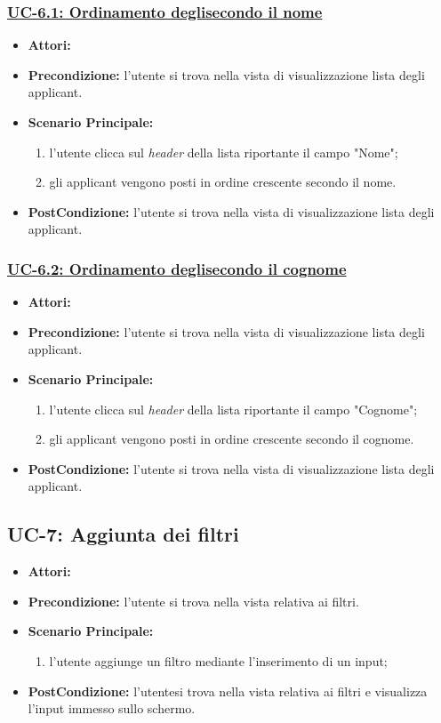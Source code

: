 \subsubsection{\underline{UC-6.1: Ordinamento degli\applicant secondo il nome}}
\begin{itemize}
	\item \textbf{Attori:}\loggedusr
	\item \textbf{Precondizione:} l'utente si trova nella vista di visualizzazione lista degli applicant.
	\item \textbf{Scenario Principale:}
	\begin{enumerate}
		\item l'utente clicca sul \textit{header} della lista riportante il campo "Nome";
		\item gli applicant vengono posti in ordine crescente secondo il nome.
	\end{enumerate}
	\item \textbf{PostCondizione:}  l'utente si trova nella vista di visualizzazione lista degli applicant.
\end{itemize}

\subsubsection{\underline{UC-6.2: Ordinamento degli\applicant secondo il cognome}}
\begin{itemize}
	\item \textbf{Attori:}\loggedusr
	\item \textbf{Precondizione:} l'utente si trova nella vista di visualizzazione lista degli applicant.
	\item \textbf{Scenario Principale:}
	\begin{enumerate}
		\item l'utente clicca sul \textit{header} della lista riportante il campo "Cognome";
		\item gli applicant vengono posti in ordine crescente secondo il cognome.
	\end{enumerate}
	\item \textbf{PostCondizione:}  l'utente si trova nella vista di visualizzazione lista degli applicant.
\end{itemize}

\subsection{UC-7: Aggiunta dei filtri}
\begin{itemize}
\item \textbf{Attori:}\loggedusr
\item \textbf{Precondizione:} l'utente si trova nella vista relativa ai filtri.
\item \textbf{Scenario Principale:}
\begin{enumerate}
	\item l'utente aggiunge un filtro mediante l'inserimento di un input;
\end{enumerate}
\item \textbf{PostCondizione:} l'utentesi trova nella vista relativa ai filtri e visualizza l'input immesso sullo schermo.
\end{itemize}

